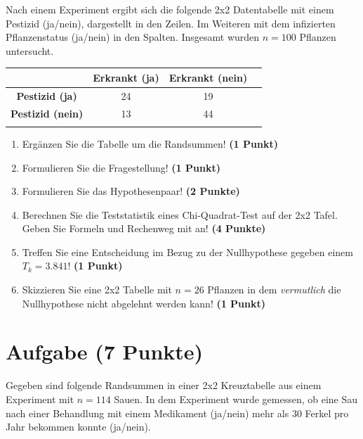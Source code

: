 \documentclass[a4paper, 10pt]{scrartcl}\usepackage[]{graphicx}\usepackage[]{xcolor}
\begin{document}
Nach einem Experiment ergibt sich die folgende 2x2 Datentabelle mit einem
Pestizid (ja/nein), dargestellt in den Zeilen. Im Weiteren mit dem
infizierten Pflanzenstatus (ja/nein) in den Spalten. Insgesamt wurden
$n = 100$ Pflanzen untersucht.
\vspace{5Ex}

\begin{center}
  \Large
  \begin{tabular}{c|c|c|c}
     & \textbf{Erkrankt (ja)} & \textbf{Erkrankt (nein)} &  \strut\\
    \hline
    \textbf{Pestizid (ja)} & 24  & 19  &     \strut\\
    \hline
    \textbf{Pestizid (nein)} & 13  & 44  &      \strut\\
    \hline
     \phantom{100} & \phantom{100}  & \phantom{100}  &  \phantom{100}  \strut\\
  \end{tabular}
\end{center}

\vspace{5Ex}

\begin{enumerate}
\item Erg{\"a}nzen Sie die Tabelle um die Randsummen! \textbf{(1 Punkt)} 
\item Formulieren Sie die Fragestellung! \textbf{(1 Punkt)}
\item Formulieren Sie das Hypothesenpaar! \textbf{(2 Punkte)}
\item Berechnen Sie die Teststatistik eines Chi-Quadrat-Test auf der 2x2
  Tafel. Geben Sie Formeln und Rechenweg mit an! \textbf{(4 Punkte)}
\item Treffen Sie eine Entscheidung im Bezug zu der Nullhypothese gegeben
  einem $T_k = 3.841$! \textbf{(1 Punkt)}
\item Skizzieren Sie eine 2x2 Tabelle mit
  $n = 26$ Pflanzen in dem \textit{vermutlich}
  die Nullhypothese nicht abgelehnt werden kann! \textbf{(1 Punkt)}
\end{enumerate} 
\clearpage

\section{Aufgabe \hfill (7 Punkte)}



Gegeben sind folgende Randsummen in einer 2x2 Kreuztabelle aus einem
Experiment mit $n = 114$ Sauen. In dem Experiment wurde gemessen,
ob eine Sau nach einer Behandlung mit einem Medikament (ja/nein)
mehr als 30 Ferkel pro Jahr bekommen konnte (ja/nein).
\end{document}
